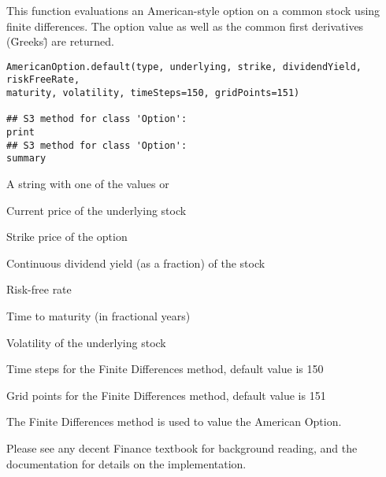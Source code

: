 \begin{Description}\relax
This function evaluations an American-style option on a common stock
using finite differences. The option value as well as the common first
derivatives (\"Greeks\") are returned.
\end{Description}
\begin{Usage}
\begin{verbatim}
AmericanOption.default(type, underlying, strike, dividendYield, riskFreeRate,
maturity, volatility, timeSteps=150, gridPoints=151)

## S3 method for class 'Option':
print
## S3 method for class 'Option':
summary
\end{verbatim}
\end{Usage}
\begin{Arguments}
\begin{ldescription}
\item[\code{type}] A string with one of the values  or 
\item[\code{underlying}] Current price of the underlying stock
\item[\code{strike}] Strike price of the option
\item[\code{dividendYield}] Continuous dividend yield (as a fraction) of the stock
\item[\code{riskFreeRate}] Risk-free rate
\item[\code{maturity}] Time to maturity (in fractional years)
\item[\code{volatility}] Volatility of the underlying stock
\item[\code{timeSteps}] Time steps for the Finite Differences method, default
value is 150
\item[\code{gridPoints}] Grid points for the Finite Differences method,
default value is 151
\end{ldescription}
\end{Arguments}
\begin{Details}\relax
The Finite Differences method is used to value the American Option.

Please see any decent Finance textbook for background reading, and
the  documentation for details on the 
implementation.
\end{Details}

